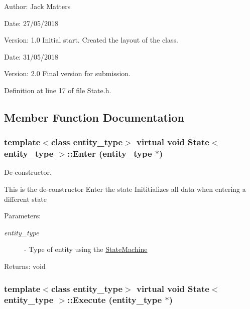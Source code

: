 \begin{Desc}
\item[Author:]Jack Matters\end{Desc}
\begin{Desc}
\item[Date:]27/05/2018 \end{Desc}
\begin{Desc}
\item[Version:]1.0 Initial start. Created the layout of the class.\end{Desc}
\begin{Desc}
\item[Date:]31/05/2018 \end{Desc}
\begin{Desc}
\item[Version:]2.0 Final version for submission. \end{Desc}


Definition at line 17 of file State.h.

\subsection{Member Function Documentation}
\hypertarget{class_state_88e14ab108f9e28a53630c4557b9743d}{
\subsubsection[Enter]{\setlength{\rightskip}{0pt plus 5cm}template$<$class entity\_\-type$>$ virtual void {\bf State}$<$ entity\_\-type $>$::Enter (entity\_\-type $\ast$)}}
\label{class_state_88e14ab108f9e28a53630c4557b9743d}


De-constructor. 

This is the de-constructor Enter the state Inititializes all data when entering a different state

\begin{Desc}
\item[Parameters:]
\begin{description}
\item[{\em entity\_\-type}]- Type of entity using the \hyperlink{class_state_machine}{StateMachine}\end{description}
\end{Desc}
\begin{Desc}
\item[Returns:]void \end{Desc}
\hypertarget{class_state_f12fe8dcc213356992ae0ad9f8d315ff}{
\subsubsection[Execute]{\setlength{\rightskip}{0pt plus 5cm}template$<$class entity\_\-type$>$ virtual void {\bf State}$<$ entity\_\-type $>$::Execute (entity\_\-type $\ast$)}}
\label{class_state_f12fe8dcc213356992ae0ad9f8d315ff}


